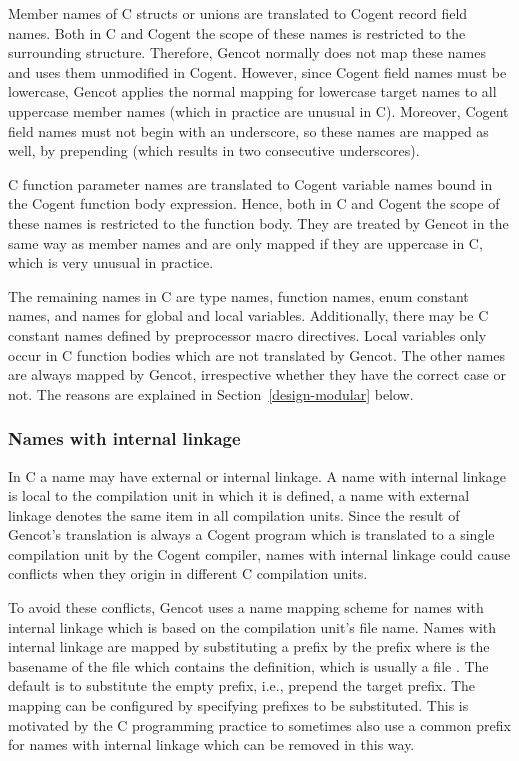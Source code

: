 Member names of C structs or unions are translated to Cogent record field names. Both in C and Cogent the scope of these
names is restricted to the surrounding structure. Therefore, Gencot normally does not map these names and uses them unmodified
in Cogent. However, since Cogent field names must be lowercase, Gencot applies the normal mapping for lowercase target 
names to all uppercase member names (which in practice are unusual in C). Moreover, Cogent field names must not begin
with an underscore, so these names are mapped as well, by prepending  (which results in two consecutive 
underscores).

C function parameter names are translated to Cogent variable names bound in the Cogent function body expression. Hence, both
in C and Cogent the scope of these names is restricted to the function body. They are treated by Gencot in the same way as 
member names and are only mapped if they are uppercase in C, which is very unusual in practice.

The remaining names in C are type names, function names, enum constant names, and names for global and local variables.
Additionally, there may be C constant names defined by preprocessor macro directives.
Local variables only occur in C function bodies which are not translated by Gencot. The other names are always mapped by
Gencot, irrespective whether they have the correct case or not. The reasons are explained in Section~\ref{design-modular}
below.

\subsubsection{Names with internal linkage}

In C a name may have external or internal linkage. A name with internal linkage is local to the compilation unit in which it
is defined, a name with external linkage denotes the same item in all compilation units. Since the result of Gencot's 
translation is always a Cogent program which is translated to a single compilation unit by the Cogent compiler, names 
with internal linkage could cause conflicts when they origin in different C compilation units.

To avoid these conflicts, Gencot uses a name mapping scheme for names with internal linkage which is based on the 
compilation unit's file name. Names with internal linkage are mapped by substituting a prefix by the prefix 
where  is the basename of the file which contains the definition, which is usually a file . The default
is to substitute the empty prefix, i.e., prepend the target prefix. The mapping can be configured by specifying prefixes
to be substituted. This is motivated by the C programming practice to sometimes also use a common prefix for names 
with internal linkage which can be removed in this way.

